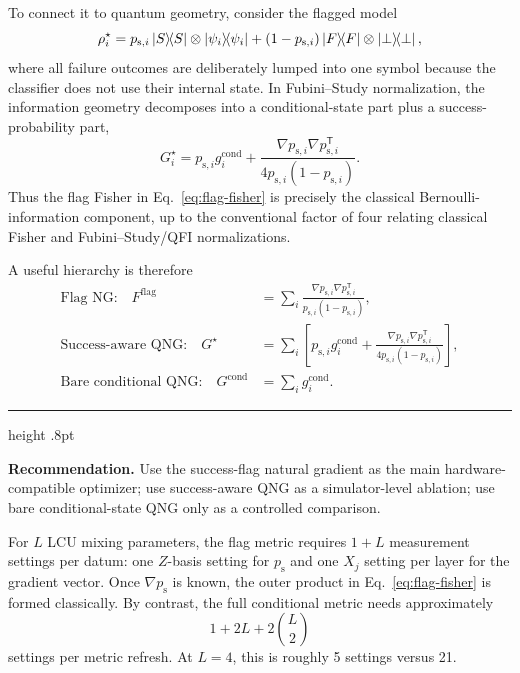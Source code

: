 \documentclass[11pt,a4paper]{article}
\newcommand{\psucc}{p_{\mathrm{s}}}
\newcommand{\T}{\mathsf{T}}
\newenvironment{keybox}
 {\par\smallskip\noindent\begin{minipage}{\linewidth}%
  {\color{blue!45!black}\hrule height .8pt}\vspace{5pt}}
 {\vspace{5pt}{\color{blue!45!black}\hrule height .8pt}%
  \end{minipage}\par\smallskip}
\begin{document}
To connect it to quantum geometry, consider the flagged model
\begin{equation}
\rho_i^\star
=
p_{\mathrm{s},i}\ketbra{S}{S}\otimes\ketbra{\psi_i}{\psi_i}
+
(1-p_{\mathrm{s},i})\ketbra{F}{F}\otimes\ketbra{\perp}{\perp},
\end{equation}
where all failure outcomes are deliberately lumped into one symbol because the classifier does not use their internal state. In Fubini--Study normalization, the information geometry decomposes into a conditional-state part plus a success-probability part,
\begin{equation}
\boxed{
 G_i^\star
 =p_{\mathrm{s},i} g_i^{\mathrm{cond}}
 +\frac{
 \nabla p_{\mathrm{s},i}\nabla p_{\mathrm{s},i}^{\T}
 }{
 4p_{\mathrm{s},i}(1-p_{\mathrm{s},i})
 }.
}
\label{eq:flagged-qfi}
\end{equation}
Thus the flag Fisher in Eq.~\eqref{eq:flag-fisher} is precisely the classical Bernoulli-information component, up to the conventional factor of four relating classical Fisher and Fubini--Study/QFI normalizations.

A useful hierarchy is therefore
\begin{align}
\text{Flag NG:}\quad
F^{\mathrm{flag}}
&=\sum_i
\frac{\nabla p_{\mathrm{s},i}\nabla p_{\mathrm{s},i}^{\T}}
{p_{\mathrm{s},i}(1-p_{\mathrm{s},i})},\\[0.4em]
\text{Success-aware QNG:}\quad
G^\star
&=\sum_i\left[
p_{\mathrm{s},i} g_i^{\mathrm{cond}}
+\frac{\nabla p_{\mathrm{s},i}\nabla p_{\mathrm{s},i}^{\T}}
{4p_{\mathrm{s},i}(1-p_{\mathrm{s},i})}
\right],\\[0.4em]
\text{Bare conditional QNG:}\quad
G^{\mathrm{cond}}
&=\sum_i g_i^{\mathrm{cond}}.
\end{align}

\begin{keybox}
\textbf{Recommendation.} Use the success-flag natural gradient as the main hardware-compatible optimizer; use success-aware QNG as a simulator-level ablation; use bare conditional-state QNG only as a controlled comparison.
\end{keybox}

For $L$ LCU mixing parameters, the flag metric requires $1+L$ measurement settings per datum: one $Z$-basis setting for $\psucc$ and one $X_j$ setting per layer for the gradient vector. Once $\nabla\psucc$ is known, the outer product in Eq.~\eqref{eq:flag-fisher} is formed classically. By contrast, the full conditional metric needs approximately
\begin{equation}
    1+2L+2\binom{L}{2}
\end{equation}
settings per metric refresh. At $L=4$, this is roughly 5 settings versus 21.
\end{document}
